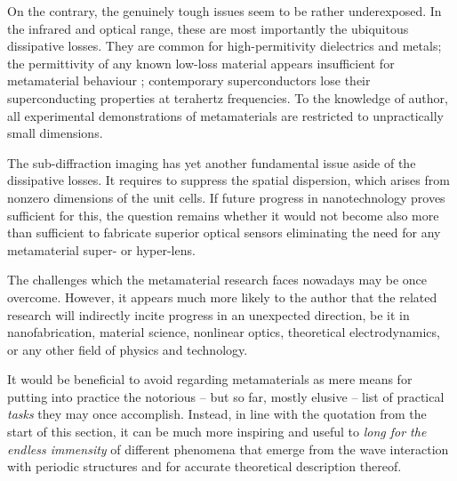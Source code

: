 On the contrary, the genuinely tough issues seem to be rather underexposed. In the infrared and optical range, these are most importantly the ubiquitous dissipative losses. They are common for high-permitivity dielectrics and metals; the permittivity of any known low-loss material appears insufficient for metamaterial behaviour \cite{dominec2014transition}; contemporary superconductors lose their superconducting properties at terahertz frequencies. To the knowledge of author, all experimental demonstrations of metamaterials are restricted to unpractically small dimensions. 

The sub-diffraction imaging has yet another fundamental issue aside of the dissipative losses. It requires to suppress the spatial dispersion, which arises from nonzero dimensions of the unit cells. If future progress in nanotechnology proves sufficient for this, the question remains whether it would not become also more than sufficient to fabricate superior optical sensors eliminating the need for any metamaterial super- or hyper-lens. 

The challenges which the metamaterial research faces nowadays may be once overcome. However, it appears much more likely to the author that the related research will indirectly incite progress in an unexpected direction, be it in nanofabrication, material science, nonlinear optics, theoretical electrodynamics, or any other field of physics and technology.

It would be beneficial to avoid regarding metamaterials as mere means for putting into practice the notorious -- but so far, mostly elusive -- list of practical \textit{tasks} they may once accomplish. Instead, in line with the quotation from the start of this section, it can be much more inspiring and useful to \textit{long for the endless immensity} of different phenomena that emerge from the wave interaction with periodic structures and for accurate theoretical description thereof. 

